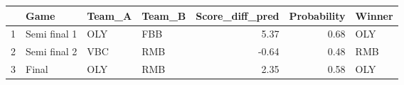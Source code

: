 \begin{table}[ht]
\centering
\begin{tabular}{rlllrrl}
  \hline
 & Game & Team\_A & Team\_B & Score\_diff\_pred & Probability & Winner \\ 
  \hline
1 & Semi final 1 & OLY & FBB & 5.37 & 0.68 & OLY \\ 
  2 & Semi final 2 & VBC & RMB & -0.64 & 0.48 & RMB \\ 
  3 & Final & OLY & RMB & 2.35 & 0.58 & OLY \\ 
   \hline
\end{tabular}
\end{table}
